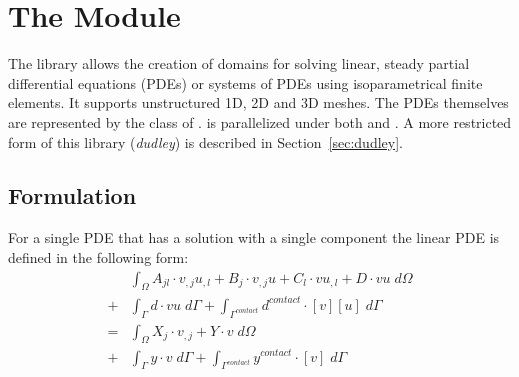 
%
%
%

\chapter{The \finley Module}\label{chap:finley}

The \finley library allows the creation of domains for solving
linear, steady partial differential
equations (PDEs) or systems
of PDEs using isoparametrical finite elements.
It supports unstructured 1D, 2D and 3D meshes.
The PDEs themselves are represented by the \LinearPDE class
of \escript.
\finley is parallelized under both \OPENMP and \MPI.
A more restricted form of this library ({\it dudley}) is described in 
Section~\ref{sec:dudley}.

\section{Formulation}
For a single PDE that has a solution with a single component the linear PDE is
defined in the following form:
\begin{equation}\label{FINLEY.SINGLE.1}
\begin{array}{cl} &
\displaystyle{
\int_{\Omega}
A_{jl} \cdot v_{,j}u_{,l}+ B_{j} \cdot v_{,j} u+ C_{l} \cdot v u_{,l}+D \cdot vu \; d\Omega }  \\
+ & \displaystyle{\int_{\Gamma} d \cdot vu \; d{\Gamma} }
+  \displaystyle{\int_{\Gamma^{contact}} d^{contact} \cdot [v][u] \; d{\Gamma} } \\
= & \displaystyle{\int_{\Omega}  X_{j} \cdot v_{,j}+ Y \cdot v \; d\Omega }\\
+ & \displaystyle{\int_{\Gamma} y \cdot v \; d{\Gamma}}  +
\displaystyle{\int_{\Gamma^{contact}} y^{contact}\cdot [v] \; d{\Gamma}} \\
\end{array}
\end{equation}

